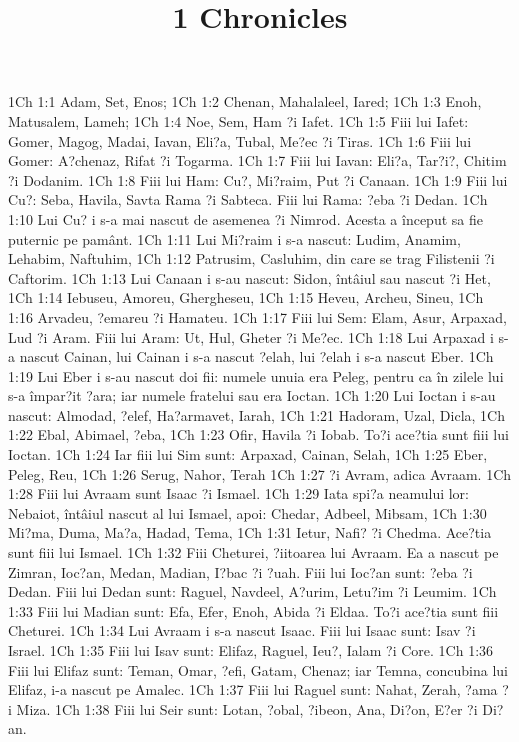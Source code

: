 

\title{1 Chronicles}

1Ch 1:1  Adam, Set, Enos;
1Ch 1:2  Chenan, Mahalaleel, Iared;
1Ch 1:3  Enoh, Matusalem, Lameh;
1Ch 1:4  Noe, Sem, Ham ?i Iafet.
1Ch 1:5  Fiii lui Iafet: Gomer, Magog, Madai, Iavan, Eli?a, Tubal, Me?ec ?i Tiras.
1Ch 1:6  Fiii lui Gomer: A?chenaz, Rifat ?i Togarma.
1Ch 1:7  Fiii lui Iavan: Eli?a, Tar?i?, Chitim ?i Dodanim.
1Ch 1:8  Fiii lui Ham: Cu?, Mi?raim, Put ?i Canaan.
1Ch 1:9  Fiii lui Cu?: Seba, Havila, Savta Rama ?i Sabteca. Fiii lui Rama: ?eba ?i Dedan.
1Ch 1:10  Lui Cu? i s-a mai nascut de asemenea ?i Nimrod. Acesta a început sa fie puternic pe pamânt.
1Ch 1:11  Lui Mi?raim i s-a nascut: Ludim, Anamim, Lehabim, Naftuhim,
1Ch 1:12  Patrusim, Casluhim, din care se trag Filistenii ?i Caftorim.
1Ch 1:13  Lui Canaan i s-au nascut: Sidon, întâiul sau nascut ?i Het,
1Ch 1:14  Iebuseu, Amoreu, Ghergheseu,
1Ch 1:15  Heveu, Archeu, Sineu,
1Ch 1:16  Arvadeu, ?emareu ?i Hamateu.
1Ch 1:17  Fiii lui Sem: Elam, Asur, Arpaxad, Lud ?i Aram. Fiii lui Aram: Ut, Hul, Gheter ?i Me?ec.
1Ch 1:18  Lui Arpaxad i s-a nascut Cainan, lui Cainan i s-a nascut ?elah, lui ?elah i s-a nascut Eber.
1Ch 1:19  Lui Eber i s-au nascut doi fii: numele unuia era Peleg, pentru ca în zilele lui s-a împar?it ?ara; iar numele fratelui sau era Ioctan.
1Ch 1:20  Lui Ioctan i s-au nascut: Almodad, ?elef, Ha?armavet, Iarah,
1Ch 1:21  Hadoram, Uzal, Dicla,
1Ch 1:22  Ebal, Abimael, ?eba,
1Ch 1:23  Ofir, Havila ?i Iobab. To?i ace?tia sunt fiii lui Ioctan.
1Ch 1:24  Iar fiii lui Sim sunt: Arpaxad, Cainan, Selah,
1Ch 1:25  Eber, Peleg, Reu,
1Ch 1:26  Serug, Nahor, Terah
1Ch 1:27  ?i Avram, adica Avraam.
1Ch 1:28  Fiii lui Avraam sunt Isaac ?i Ismael.
1Ch 1:29  Iata spi?a neamului lor: Nebaiot, întâiul nascut al lui Ismael, apoi: Chedar, Adbeel, Mibsam,
1Ch 1:30  Mi?ma, Duma, Ma?a, Hadad, Tema,
1Ch 1:31  Ietur, Nafi? ?i Chedma. Ace?tia sunt fiii lui Ismael.
1Ch 1:32  Fiii Cheturei, ?iitoarea lui Avraam. Ea a nascut pe Zimran, Ioc?an, Medan, Madian, I?bac ?i ?uah. Fiii lui Ioc?an sunt: ?eba ?i Dedan. Fiii lui Dedan sunt: Raguel, Navdeel, A?urim, Letu?im ?i Leumim.
1Ch 1:33  Fiii lui Madian sunt: Efa, Efer, Enoh, Abida ?i Eldaa. To?i ace?tia sunt fiii Cheturei.
1Ch 1:34  Lui Avraam i s-a nascut Isaac. Fiii lui Isaac sunt: Isav ?i Israel.
1Ch 1:35  Fiii lui Isav sunt: Elifaz, Raguel, Ieu?, Ialam ?i Core.
1Ch 1:36  Fiii lui Elifaz sunt: Teman, Omar, ?efi, Gatam, Chenaz; iar Temna, concubina lui Elifaz, i-a nascut pe Amalec.
1Ch 1:37  Fiii lui Raguel sunt: Nahat, Zerah, ?ama ?i Miza.
1Ch 1:38  Fiii lui Seir sunt: Lotan, ?obal, ?ibeon, Ana, Di?on, E?er ?i Di?an.
